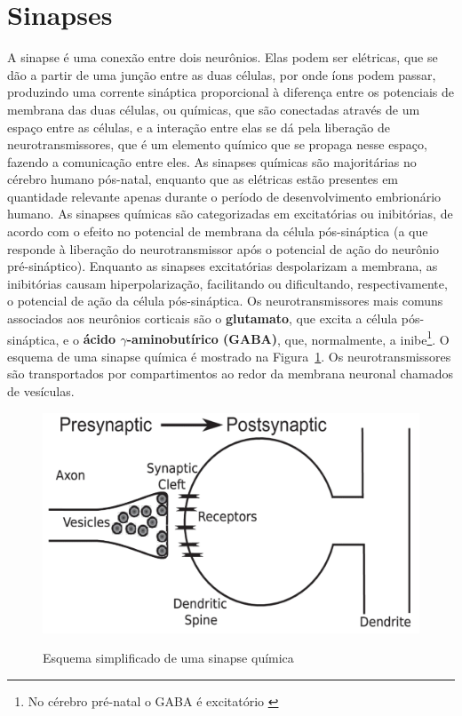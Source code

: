 \section{Sinapses}\label{sec:sinapses}
A sinapse é uma conexão entre dois neurônios. Elas podem ser elétricas, que se dão a partir de uma junção entre as duas células, por onde íons podem passar, produzindo uma corrente sináptica proporcional à diferença entre os potenciais de membrana das duas células, ou químicas, que são conectadas através de um espaço entre as células, e a interação entre elas se dá pela liberação de neurotransmissores, que é um elemento químico que se propaga nesse espaço, fazendo a comunicação entre eles. As sinapses químicas são majoritárias no cérebro humano pós-natal, enquanto que as elétricas estão presentes em quantidade relevante apenas durante o período de desenvolvimento embrionário humano. As sinapses químicas são categorizadas em excitatórias ou inibitórias, de acordo com o efeito no potencial de membrana da célula pós-sináptica (a que responde à liberação do neurotransmissor após o potencial de ação do neurônio pré-sináptico). Enquanto as sinapses excitatórias despolarizam a membrana, as inibitórias causam hiperpolarização, facilitando ou dificultando, respectivamente, o potencial de ação da célula pós-sináptica. Os neurotransmissores mais comuns associados aos neurônios corticais são o \textbf{glutamato}, que excita a célula pós-sináptica, e o \textbf{ácido $\gamma$-aminobutírico (GABA)}, que, normalmente, a inibe\footnote{No cérebro pré-natal o GABA é excitatório \cite{ben-ari_excitatory_2002}}.
O esquema de uma sinapse química é mostrado na Figura~\ref{fig:sinapses}. Os neurotransmissores são transportados por compartimentos ao redor da membrana neuronal chamados de vesículas.
\begin{figure}[tb]
	\centering
	\caption{Esquema simplificado de uma sinapse química}
	\label{fig:sinapses}
	\includegraphics[width=0.7\linewidth]{figs/sinapses}\\
\end{figure}

